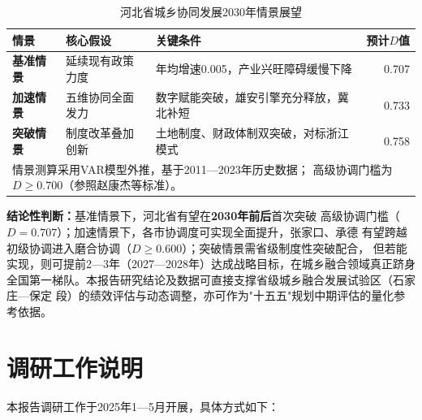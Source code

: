 \documentclass[12pt, a4paper, twoside]{ctexart}
\begin{document}
\begin{table}[H]
  \centering
  \caption{河北省城乡协同发展2030年情景展望}
  \label{tab:scenario}
  \begin{tabularx}{\linewidth}{l l X r}
    \toprule
    \rowcolor{TableHead}
    \color{white}\bfseries 情景 &
    \color{white}\bfseries 核心假设 &
    \color{white}\bfseries 关键条件 &
    \color{white}\bfseries 预计$D$值 \\
    \midrule
    \textbf{基准情景} &
      延续现有政策力度 &
      年均增速0.005，产业兴旺障碍缓慢下降 &
      0.707 \\
    \rowcolor{TableRow}
    \textbf{加速情景} &
      五维协同全面发力 &
      数字赋能突破，雄安引擎充分释放，冀北补短 &
      0.733 \\
    \textbf{突破情景} &
      制度改革叠加创新 &
      土地制度、财政体制双突破，对标浙江模式 &
      0.758 \\
    \bottomrule
    \multicolumn{4}{l}{\footnotesize 情景测算采用VAR模型外推，基于2011—2023年历史数据；
      高级协调门槛为$D\geq0.700$（参照赵康杰等\cite{zhao2026}标准）。}
  \end{tabularx}
\end{table}

\noindent\textbf{结论性判断：}基准情景下，河北省有望在\textbf{2030年前后}首次突破
高级协调门槛（$D=0.707$）；加速情景下，各市协调度可实现全面提升，张家口、承德
有望跨越初级协调进入磨合协调（$D\geq0.600$）；突破情景需省级制度性突破配合，
但若能实现，则可提前2—3年（2027—2028年）达成战略目标，在城乡融合领域真正跻身
全国第一梯队。本报告研究结论及数据可直接支撑省级城乡融合发展试验区（石家庄—保定
段）的绩效评估与动态调整，亦可作为"十五五"规划中期评估的量化参考依据。

\printbibliography[title={参考文献}]

\appendix
\section{调研工作说明}

本报告调研工作于2025年1—5月开展，具体方式如下：
\end{document}
